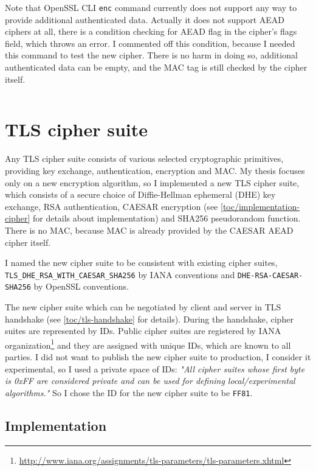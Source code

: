 \inputminted{text}{code/test-enc.sh.out}

Note that OpenSSL CLI \texttt{enc} command currently does not support any way to provide additional authenticated data. Actually it does not support AEAD ciphers at all, there is a condition checking for AEAD flag in the cipher's flags field, which throws an error. I commented off this condition, because I needed this command to test the new cipher. There is no harm in doing so, additional authenticated data can be empty, and the MAC tag is still checked by the cipher itself.

\inputminted{c}{code/openssl/apps/enc.c}


\section{TLS cipher suite}
\label{toc/implementation-cipher-suite}

Any TLS cipher suite consists of various selected cryptographic primitives, providing key exchange, authentication, encryption and MAC. My thesis focuses only on a new encryption algorithm, so I implemented a new TLS cipher suite, which consists of a secure choice of Diffie-Hellman ephemeral (DHE) key exchange, RSA authentication, CAESAR encryption (see \autoref{toc/implementation-cipher} for details about implementation) and SHA256 pseudorandom function. There is no MAC, because MAC is already provided by the CAESAR AEAD cipher itself.

I named the new cipher suite to be consistent with existing cipher suites, \texttt{TLS\_DHE\_RSA\_WITH\_CAESAR\_SHA256} by IANA conventions and \texttt{DHE-RSA-CAESAR-SHA256} by OpenSSL conventions.

The new cipher suite which can be negotiated by client and server in TLS handshake (see \autoref{toc/tls-handshake} for details). During the handshake, cipher suites are represented by IDs. Public cipher suites are registered by IANA organization\footnote{\url{http://www.iana.org/assignments/tls-parameters/tls-parameters.xhtml}} and they are assigned with unique IDs, which are known to all parties. I did not want to publish the new cipher suite to production, I consider it experimental, so I used a private space of IDs: \textit{"All cipher suites whose first byte is 0xFF are considered private and can be used for defining local/experimental algorithms."} \cite{rfc2246} So I chose the ID for the new cipher suite to be \texttt{FF81}.

\subsection{Implementation}

